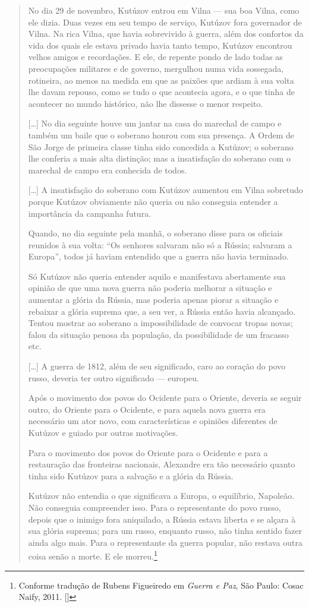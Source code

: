 \begin{quote}
No dia 29 de novembro, Kutúzov entrou em Vilna --- sua boa Vilna, como ele
dizia. Duas vezes em seu tempo de serviço, Kutúzov fora governador de
Vilna. Na rica Vilna, que havia sobrevivido à guerra, além dos confortos
da vida dos quais ele estava privado havia tanto tempo, Kutúzov
encontrou velhos amigos e recordações. E ele, de repente pondo de lado
todas as preocupações militares e de governo, mergulhou numa vida
sossegada, rotineira, ao menos na medida em que as paixões que ardiam à
sua volta lhe davam repouso, como se tudo o que acontecia agora, e o que
tinha de acontecer no mundo histórico, não lhe dissesse o menor
respeito.

[\ldots{}] No dia seguinte houve um jantar na casa do marechal de campo e
também um baile que o soberano honrou com sua presença. A Ordem de São
Jorge de primeira classe tinha sido concedida a Kutúzov; o soberano lhe
conferia a mais alta distinção; mas a insatisfação do soberano com o
marechal de campo era conhecida de todos.

[\ldots{}] A insatisfação do soberano com Kutúzov aumentou em Vilna sobretudo
porque Kutúzov obviamente não queria ou não conseguia entender a
importância da campanha futura.

Quando, no dia seguinte pela manhã, o soberano disse para os oficiais
reunidos à sua volta: ``Os senhores salvaram não só a Rússia; salvaram a
Europa'', todos já haviam entendido que a guerra não havia terminado.

Só Kutúzov não queria entender aquilo e manifestava abertamente sua
opinião de que uma nova guerra não poderia melhorar a situação e
aumentar a glória da Rússia, mas poderia apenas piorar a situação e
rebaixar a glória suprema que, a seu ver, a Rússia então havia
alcançado. Tentou mostrar ao soberano a impossibilidade de convocar
tropas novas; falou da situação penosa da população, da possibilidade de
um fracasso etc.

[\ldots{}] A guerra de 1812, além de seu significado, caro ao coração do povo
russo, deveria ter outro significado --- europeu.

Após o movimento dos povos do Ocidente para o Oriente, deveria se seguir
outro, do Oriente para o Ocidente, e para aquela nova guerra era
necessário um ator novo, com características e opiniões diferentes de
Kutúzov e guiado por outras motivações.

Para o movimento dos povos do Oriente para o Ocidente e para a
restauração das fronteiras nacionais, Alexandre  era tão necessário
quanto tinha sido Kutúzov para a salvação e a glória da Rússia.

Kutúzov não entendia o que significava a Europa, o equilíbrio, Napoleão.
Não conseguia compreender isso. Para o representante do povo russo,
depois que o inimigo fora aniquilado, a Rússia estava liberta e se
alçara à sua glória suprema; para um russo, enquanto russo, não tinha
sentido fazer ainda algo mais. Para o representante da guerra popular,
não restava outra coisa senão a morte. E ele morreu.\footnote{Conforme tradução de Rubens Figueiredo em \textit{Guerra e Paz}, São Paulo: Cosac Naify, 2011. []} 
\end{quote}

